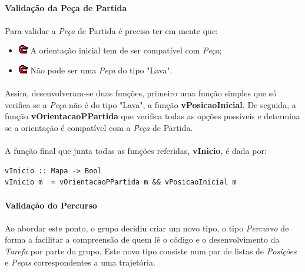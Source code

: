 \documentclass[12pt,a4paper]{report}
\begin{document}
\paragraph{}\textbf{Validação da Peça de Partida}

\paragraph{} Para validar a \textit{Peça} de Partida é preciso ter em mente que:

 \begin{itemize}
 \item[]\includegraphics[scale=0.7]{p4.png} A orientação inicial tem de ser compatível com \textit{Peça};
 \item[]\includegraphics[scale=0.7]{p4.png} Não pode ser uma \textit{Peça} do tipo "Lava".
 \end{itemize}
 
 \paragraph{}Assim, desenvolveram-se duas funções, primeiro uma função simples que só verifica se a \textit{Peça} não é do tipo "Lava", a função \textbf{vPosicaoInicial}.
 \newline De seguida, a função \textbf{vOrientacaoPPartida} que verifica todas as opções possíveis e determina se a orientação é compatível com a \textit{Peça} de Partida.
 \paragraph{}A função final que junta todas as funções referidas, \textbf{vInicio}, é dada por:
 
 \begin{verbatim}
vInicio :: Mapa -> Bool
vInicio m  = vOrientacaoPPartida m && vPosicaoInicial m
 \end{verbatim}
 
\paragraph{}\textbf{Validação do Percurso}
\paragraph{}Ao abordar este ponto, o grupo decidiu criar um novo tipo, o tipo \textit{Percurso} de forma a facilitar a compreensão de quem lê o código e o desenvolvimento da \textit{Tarefa} por parte do grupo. 
\newline Este novo tipo consiste num par de listas de \textit{Posições} e \textit{Peças} correspondentes a uma trajetória.
\end{document}
